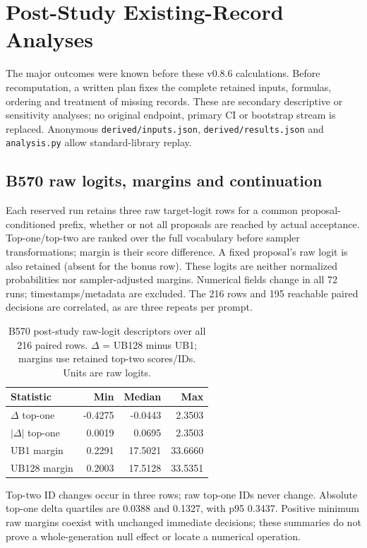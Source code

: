 \section{Post-Study Existing-Record Analyses}
\label{app:derived}
The major outcomes were known before these v0.8.6 calculations. Before recomputation, a written plan fixes the complete retained inputs, formulas, ordering and treatment of missing records. These are secondary descriptive or sensitivity analyses; no original endpoint, primary CI or bootstrap stream is replaced. Anonymous \texttt{derived/inputs.json}, \texttt{derived/results.json} and \texttt{analysis.py} allow standard-library replay.

\subsection{B570 raw logits, margins and continuation}
Each reserved run retains three raw target-logit rows for a common proposal-conditioned prefix, whether or not all proposals are reached by actual acceptance. Top-one/top-two are ranked over the full vocabulary before sampler transformations; margin is their score difference. A fixed proposal's raw logit is also retained (absent for the bonus row). These logits are neither normalized probabilities nor sampler-adjusted margins. Numerical fields change in all 72 runs; timestamps/metadata are excluded. The 216 rows and 195 reachable paired decisions are correlated, as are three repeats per prompt.
\begin{table}[t]
\caption{B570 post-study raw-logit descriptors over all 216 paired rows. $\Delta$ = UB128 minus UB1; margins use retained top-two scores/IDs. Units are raw logits.}
\label{tab:scorederived}
\centering
\begin{tabular}{lrrr}
\toprule
Statistic & Min & Median & Max \\
\midrule
$\Delta$ top-one & -0.4275 & -0.0443 & 2.3503 \\
$|\Delta|$ top-one & 0.0019 & 0.0695 & 2.3503 \\
UB1 margin & 0.2291 & 17.5021 & 33.6660 \\
UB128 margin & 0.2003 & 17.5128 & 33.5351 \\
\bottomrule
\end{tabular}
\end{table}
Top-two ID changes occur in three rows; raw top-one IDs never change. Absolute top-one delta quartiles are 0.0388 and 0.1327, with p95 0.3437. Positive minimum raw margins coexist with unchanged immediate decisions; these summaries do not prove a whole-generation null effect or locate a numerical operation.

